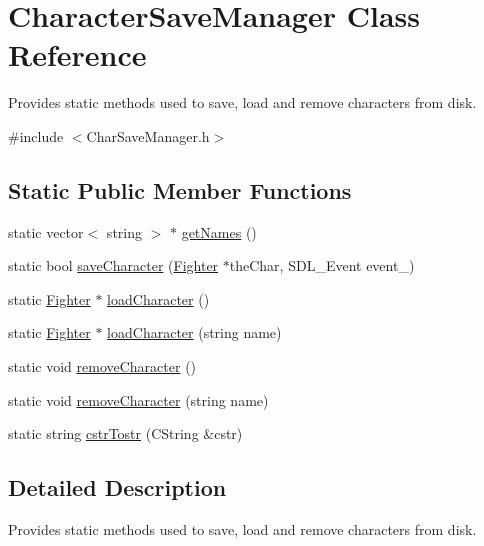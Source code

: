 \hypertarget{class_character_save_manager}{}\section{Character\+Save\+Manager Class Reference}
\label{class_character_save_manager}


Provides static methods used to save, load and remove characters from disk.  




{\ttfamily \#include $<$Char\+Save\+Manager.\+h$>$}

\subsection*{Static Public Member Functions}
\begin{DoxyCompactItemize}
\item 
static vector$<$ string $>$ $\ast$ \hyperlink{class_character_save_manager_a56637487c732f1813992d3d6b558c817}{get\+Names} ()
\item 
static bool \hyperlink{class_character_save_manager_a4cb417d00055faa42333a69d64b29da6}{save\+Character} (\hyperlink{class_fighter}{Fighter} $\ast$the\+Char, S\+D\+L\+\_\+\+Event event\+\_\+)
\item 
static \hyperlink{class_fighter}{Fighter} $\ast$ \hyperlink{class_character_save_manager_a44105e8553b29cd7e37f3eec6f1a7ce7}{load\+Character} ()
\item 
static \hyperlink{class_fighter}{Fighter} $\ast$ \hyperlink{class_character_save_manager_a8ee1fcce6a61b16b41dfa675264d5bdf}{load\+Character} (string name)
\item 
static void \hyperlink{class_character_save_manager_af8ee3fecc5c19f1f61f98e9132a26b5f}{remove\+Character} ()
\item 
static void \hyperlink{class_character_save_manager_a49dd1eedbdf0e2b7cedfba64d4fb8d53}{remove\+Character} (string name)
\item 
static string \hyperlink{class_character_save_manager_ad9adf9eda9b89e67a977167c954a8d7c}{cstr\+Tostr} (C\+String \&cstr)
\end{DoxyCompactItemize}


\subsection{Detailed Description}
Provides static methods used to save, load and remove characters from disk. 

